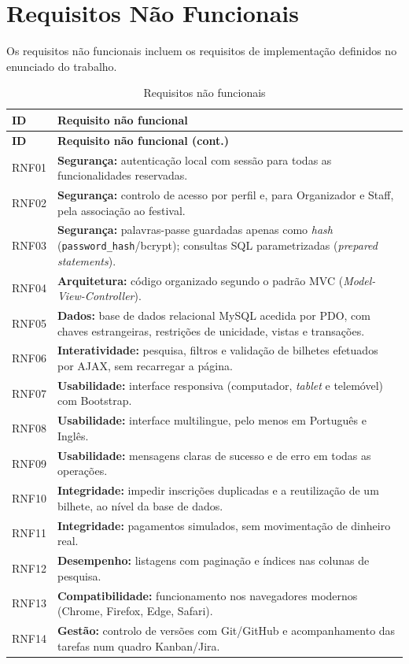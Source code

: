 \section{Requisitos Não Funcionais}

Os requisitos não funcionais incluem os requisitos de implementação definidos
no enunciado do trabalho.

\begin{longtable}{|l|p{12.4cm}|}
\caption{Requisitos não funcionais}\label{tab:rnf}\\
\hline
\textbf{ID} & \textbf{Requisito não funcional} \\ \hline
\endfirsthead
\hline
\textbf{ID} & \textbf{Requisito não funcional (cont.)} \\ \hline
\endhead
RNF01 & \textbf{Segurança:} autenticação local com sessão para todas as funcionalidades reservadas. \\ \hline
RNF02 & \textbf{Segurança:} controlo de acesso por perfil e, para Organizador e Staff, pela associação ao festival. \\ \hline
RNF03 & \textbf{Segurança:} palavras-passe guardadas apenas como \emph{hash} (\texttt{password\_hash}/bcrypt); consultas SQL parametrizadas (\emph{prepared statements}). \\ \hline
RNF04 & \textbf{Arquitetura:} código organizado segundo o padrão MVC (\emph{Model-View-Controller}). \\ \hline
RNF05 & \textbf{Dados:} base de dados relacional MySQL acedida por PDO, com chaves estrangeiras, restrições de unicidade, vistas e transações. \\ \hline
RNF06 & \textbf{Interatividade:} pesquisa, filtros e validação de bilhetes efetuados por AJAX, sem recarregar a página. \\ \hline
RNF07 & \textbf{Usabilidade:} interface responsiva (computador, \emph{tablet} e telemóvel) com Bootstrap. \\ \hline
RNF08 & \textbf{Usabilidade:} interface multilingue, pelo menos em Português e Inglês. \\ \hline
RNF09 & \textbf{Usabilidade:} mensagens claras de sucesso e de erro em todas as operações. \\ \hline
RNF10 & \textbf{Integridade:} impedir inscrições duplicadas e a reutilização de um bilhete, ao nível da base de dados. \\ \hline
RNF11 & \textbf{Integridade:} pagamentos simulados, sem movimentação de dinheiro real. \\ \hline
RNF12 & \textbf{Desempenho:} listagens com paginação e índices nas colunas de pesquisa. \\ \hline
RNF13 & \textbf{Compatibilidade:} funcionamento nos navegadores modernos (Chrome, Firefox, Edge, Safari). \\ \hline
RNF14 & \textbf{Gestão:} controlo de versões com Git/GitHub e acompanhamento das tarefas num quadro Kanban/Jira. \\ \hline
\end{longtable}

